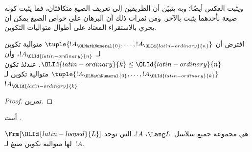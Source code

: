 \documentclass[../../../include/open-logic-section]{subfiles}
\begin{document}
ويثبت العكس أيضًا؛ وبه يتبيّن أن الطريقين إلى تعريف الصيغ
متكافئان، فما يثبت كونه صيغة بأحدهما يثبت بالآخر. ومن ثمرات ذلك
أن البرهان على خواص الصيغ يمكن أن يجري بالاستقراء المعتاد على
أطوال متواليات التكوين.

\begin{lem}
افترض أن $\tuple{!A_{\OLMathNumeral{0}},\dotsc,!A_{\OLId{latin-ordinary}{n}}}$ متوالية تكوين لـ~$!A_{\OLId{latin-ordinary}{n}}$، وأن
${\OLId{latin-ordinary}{k}} \leq {\OLId{latin-ordinary}{n}}$. عندئذ تكون $\tuple{!A_{\OLMathNumeral{0}},\dotsc,!A_{\OLId{latin-ordinary}{k}}}$ متوالية تكوين
لـ~$!A_{\OLId{latin-ordinary}{k}}$.
\end{lem}

\begin{proof}
تمرين.
\end{proof}

\begin{prob}
أثبت .
\end{prob}

\begin{thm}
$\Frm[{\OLId{latin-looped}{L}}]$ هي مجموعة جميع سلاسل~$\Lang L$، $!A$، التي توجد لها
متوالية تكوين صيغ لـ~$!A$.
\end{thm}
\end{document}
